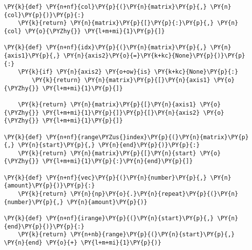 \begin{tcolorbox}[breakable, size=fbox, boxrule=1pt, pad at break*=1mm,colback=cellbackground, colframe=cellborder]
    \begin{Verbatim}[commandchars=\\\{\}]
\PY{k}{def} \PY{n+nf}{col}\PY{p}{(}\PY{n}{matrix}\PY{p}{,} \PY{n}{col}\PY{p}{)}\PY{p}{:}
    \PY{k}{return} \PY{n}{matrix}\PY{p}{[}\PY{p}{:}\PY{p}{,} \PY{n}{col} \PY{o}{\PYZhy{}} \PY{l+m+mi}{1}\PY{p}{]}

\PY{k}{def} \PY{n+nf}{idx}\PY{p}{(}\PY{n}{matrix}\PY{p}{,} \PY{n}{axis1}\PY{p}{,} \PY{n}{axis2}\PY{o}{=}\PY{k+kc}{None}\PY{p}{)}\PY{p}{:}
    \PY{k}{if} \PY{n}{axis2} \PY{o+ow}{is} \PY{k+kc}{None}\PY{p}{:}
        \PY{k}{return} \PY{n}{matrix}\PY{p}{[}\PY{n}{axis1} \PY{o}{\PYZhy{}} \PY{l+m+mi}{1}\PY{p}{]}

    \PY{k}{return} \PY{n}{matrix}\PY{p}{[}\PY{n}{axis1} \PY{o}{\PYZhy{}} \PY{l+m+mi}{1}\PY{p}{]}\PY{p}{[}\PY{n}{axis2} \PY{o}{\PYZhy{}} \PY{l+m+mi}{1}\PY{p}{]}

\PY{k}{def} \PY{n+nf}{range\PYZus{}index}\PY{p}{(}\PY{n}{matrix}\PY{p}{,} \PY{n}{start}\PY{p}{,} \PY{n}{end}\PY{p}{)}\PY{p}{:}
    \PY{k}{return} \PY{n}{matrix}\PY{p}{[}\PY{n}{start} \PY{o}{\PYZhy{}} \PY{l+m+mi}{1}\PY{p}{:}\PY{n}{end}\PY{p}{]}

\PY{k}{def} \PY{n+nf}{vec}\PY{p}{(}\PY{n}{number}\PY{p}{,} \PY{n}{amount}\PY{p}{)}\PY{p}{:}
    \PY{k}{return} \PY{n}{np}\PY{o}{.}\PY{n}{repeat}\PY{p}{(}\PY{n}{number}\PY{p}{,} \PY{n}{amount}\PY{p}{)}

\PY{k}{def} \PY{n+nf}{irange}\PY{p}{(}\PY{n}{start}\PY{p}{,} \PY{n}{end}\PY{p}{)}\PY{p}{:}
    \PY{k}{return} \PY{n+nb}{range}\PY{p}{(}\PY{n}{start}\PY{p}{,} \PY{n}{end} \PY{o}{+} \PY{l+m+mi}{1}\PY{p}{)}
    \end{Verbatim}
\end{tcolorbox}

\pagebreak

